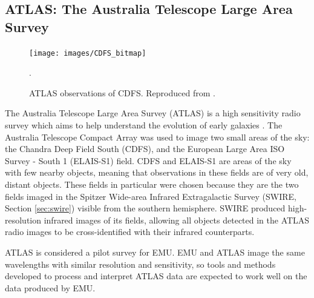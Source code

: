        \subsection{ATLAS: The Australia Telescope Large Area Survey}
        \label{sec:atlas}

            \begin{figure}[!ht]
                \centering
                \texttt{[image: images/CDFS\_bitmap]}
                \caption{ATLAS observations of CDFS.
                    Reproduced from \citet{franzen15}.}.
                \label{fig:cdfs}
            \end{figure}

            The Australia Telescope Large Area Survey (ATLAS) is a high
            sensitivity radio survey which aims to help understand the evolution
            of early galaxies \citep{norris06}. The Australia Telescope Compact
            Array was used to image two small areas of the sky: the Chandra Deep
            Field South (CDFS), and the European Large Area ISO Survey - South 1
            (ELAIS-S1) field. CDFS and ELAIS-S1 are areas of the sky with few
            nearby objects, meaning that observations in these fields are of
            very old, distant objects. These fields in particular were chosen
            because they are the two fields imaged in the Spitzer Wide-area
            Infrared Extragalactic Survey (SWIRE, Section \ref{sec:swire})
            visible from the southern hemisphere. SWIRE produced high-resolution
            infrared images of its fields, allowing all objects detected in the
            ATLAS radio images to be cross-identified with their infrared
            counterparts.

            ATLAS is considered a pilot survey for EMU. EMU and ATLAS image the
            same wavelengths with similar resolution and sensitivity, so tools
            and methods developed to process and interpret ATLAS data are
            expected to work well on the data produced by EMU.


